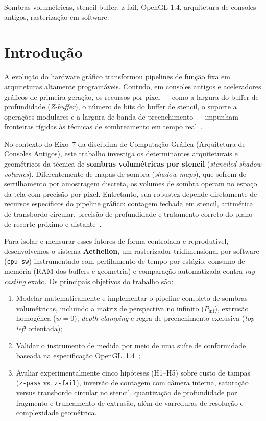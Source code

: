 \documentclass[conference]{IEEEtran}
\begin{document}
\begin{IEEEkeywords}
Sombras volumétricas, stencil buffer, z-fail, OpenGL 1.4, arquitetura de consoles antigos, rasterização em software.
\end{IEEEkeywords}

\section{Introdução}

A evolução do hardware gráfico transformou pipelines de função fixa em arquiteturas altamente programáveis. Contudo, em consoles antigos e aceleradores gráficos de primeira geração, os recursos por pixel --- como a largura do buffer de profundidade (\textit{Z-buffer}), o número de bits do buffer de stencil, o suporte a operações modulares e a largura de banda de preenchimento --- impunham fronteiras rígidas às técnicas de sombreamento em tempo real~\cite{akenine2018}.

No contexto do Eixo~7 da disciplina de Computação Gráfica (Arquitetura de Consoles Antigos), este trabalho investiga os determinantes arquiteturais e geométricos da técnica de \textbf{sombras volumétricas por stencil} (\textit{stenciled shadow volumes}). Diferentemente de mapas de sombra (\textit{shadow maps}), que sofrem de serrilhamento por amostragem discreta, os volumes de sombra operam no espaço da tela com precisão por pixel. Entretanto, sua robustez depende diretamente de recursos específicos do pipeline gráfico: contagem fechada em stencil, aritmética de transbordo circular, precisão de profundidade e tratamento correto do plano de recorte próximo e distante~\cite{everitt2002}.

Para isolar e mensurar esses fatores de forma controlada e reprodutível, desenvolvemos o sistema \textbf{Aethelion}, um rasterizador tridimensional por software (\texttt{cpu-sw}) instrumentado com perfilamento de tempo por estágio, consumo de memória (RAM dos buffers e geometria) e comparação automatizada contra \textit{ray casting} exato. Os principais objetivos do trabalho são:
\begin{enumerate}
    \item Modelar matematicamente e implementar o pipeline completo de sombras volumétricas, incluindo a matriz de perspectiva no infinito ($P_{\text{inf}}$), extrusão homogênea ($w=0$), \textit{depth clamping} e regra de preenchimento exclusiva (\textit{top-left} orientada);
    \item Validar o instrumento de medida por meio de uma suíte de conformidade baseada na especificação OpenGL~1.4~\cite{segal2002};
    \item Avaliar experimentalmente cinco hipóteses (H1--H5) sobre custo de tampas (\texttt{z-pass} vs. \texttt{z-fail}), inversão de contagem com câmera interna, saturação versus transbordo circular no stencil, quantização de profundidade por fragmento e truncamento de extrusão, além de varreduras de resolução e complexidade geométrica.
\end{enumerate}
\end{document}
